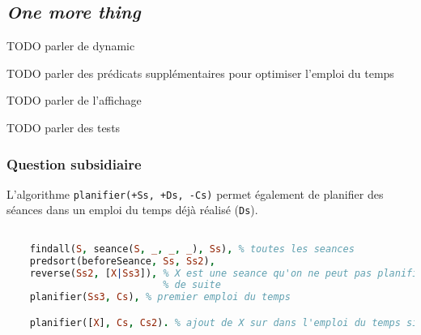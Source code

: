 
\subsection{\textit{One more thing}}

TODO parler de dynamic

TODO parler des prédicats supplémentaires pour optimiser l'emploi du temps

TODO parler de l'affichage

TODO parler des tests

\subsubsection{Question subsidiaire}

L'algorithme \texttt{planifier(+Ss, +Ds, -Cs)} permet également de planifier des
séances dans un emploi du temps déjà réalisé (\texttt{Ds}).

\begin{lstlisting}[language=Prolog, caption=Exemple d'ajout dans un EDT, captionpos=b,
label={lst:creneauValideCreneau}]

    findall(S, seance(S, _, _, _), Ss), % toutes les seances
    predsort(beforeSeance, Ss, Ss2),
    reverse(Ss2, [X|Ss3]), % X est une seance qu'on ne peut pas planifier tout
                           % de suite
    planifier(Ss3, Cs), % premier emploi du temps

    planifier([X], Cs, Cs2). % ajout de X sur dans l'emploi du temps si possible

\end{lstlisting}

